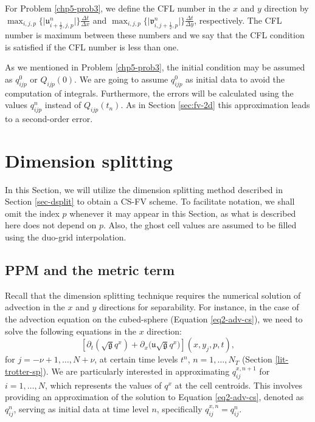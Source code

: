 \begin{remark}
	For Problem \ref{chp5-prob3}, we define the CFL number in the $x$ and $y$ direction
	by $\max_{i,j,p} \{{|\mathfrak{u}_{i+\frac{1}{2},j,p}^n}|\}\frac{\Delta t}{\Delta x}$ and 
	$\max_{i,j,p} \{ {|\mathfrak{v}_{i,j+\frac{1}{2},p}^n}|\}\frac{\Delta t}{\Delta y}$, respectively.
	The CFL number is maximum between these numbers and we say that the CFL condition is
	satisfied if the CFL number is less than one. 
\end{remark}
As we mentioned in Problem \ref{chp5-prob3}, the initial condition may be assumed as $q_{ijp}^0$ or $Q_{ijp}(0)$.
We are going to assume  $q_{ijp}^0$ as initial data to avoid the computation of integrals.
Furthermore, the errors will be calculated using the values $q_{ijp}^n$ instead of $Q_{ijp}(t_n)$.
As in Section \ref{sec:fv-2d} this approximation leads to a second-order error.


\section{Dimension splitting}
\label{sec-csdsplit}
In this Section, we will utilize the dimension splitting method described in Section \ref{sec-dsplit} to obtain a CS-FV scheme.
To facilitate notation, we shall omit the index $p$ whenever it may appear in this Section, as what is described here does not depend on $p$.
Also, the ghost cell values are assumed to be filled using the duo-grid interpolation.
\subsection{PPM and the metric term}
\label{sec-metricppm}
Recall that the dimension splitting technique requires the numerical solution of advection in the $x$ and $y$ directions for separability.
For instance, in the case of the advection equation on the cubed-sphere (Equation \eqref{eq2-adv-cs}), we need to solve the following equations in the $x$ direction:
\begin{equation}
	\label{1d-avd-eq}
		[{\partial_t (\sqrt{\mathfrak{g}} {q^x})} + {\partial_x (\mathfrak{u}\sqrt{\mathfrak{g}}{q^x}})](x, y_j, p, t),
\end{equation}
for $j=-\nu+1, \ldots, N+\nu$, at certain time levels $t^n$, $n=1, \ldots, N_T$ (Section \ref{lit-trotter-sp}).
We are particularly interested in approximating $q^{x,n+1}_{ij}$ for $i=1, \ldots, N$, which represents the values of $q^x$ at the cell centroids.
This involves providing an approximation of the solution to Equation \eqref{eq2-adv-cs}, 
denoted as $q^n_{ij}$, serving as initial data at time level $n$, specifically $q^{x,n}_{ij}=q^n_{ij}$.

